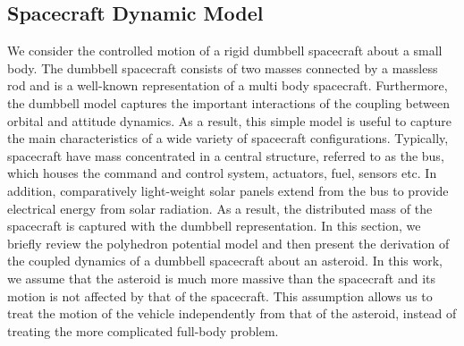 \subsection{Spacecraft Dynamic Model}\label{sec:controlled_dynamic_model}
We consider the controlled motion of a rigid dumbbell spacecraft about a small body.
The dumbbell spacecraft consists of two masses connected by a massless rod and is a well-known representation of a multi body spacecraft.
Furthermore, the dumbbell model captures the important interactions of the coupling between orbital and attitude dynamics. 
As a result, this simple model is useful to capture the main characteristics of a wide variety of spacecraft configurations.
Typically, spacecraft have mass concentrated in a central structure, referred to as the bus, which houses the command and control system, actuators, fuel, sensors etc. 
In addition, comparatively light-weight solar panels extend from the bus to provide electrical energy from solar radiation. 
As a result, the distributed mass of the spacecraft is captured with the dumbbell representation.
In this section, we briefly review the polyhedron potential model and then present the derivation of the coupled dynamics of a dumbbell spacecraft about an asteroid.
In this work, we assume that the asteroid is much more massive than the spacecraft and its motion is not affected by that of the spacecraft.
This assumption allows us to treat the motion of the vehicle independently from that of the asteroid, instead of treating the more complicated full-body problem. 

